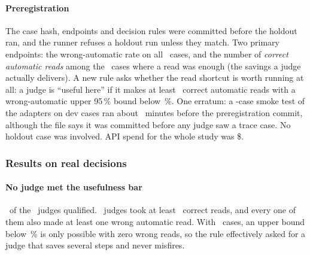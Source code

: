 \paragraph{Preregistration} The case hash, endpoints and decision rules were committed before the holdout
ran, and the runner refuses a holdout run unless they match. Two primary endpoints: the wrong-automatic rate
on all \TrN\ cases, and the number of \emph{correct automatic reads} among the \TrReadCases\ cases where a
read was enough (the savings a judge actually delivers). A new rule asks whether the read shortcut is worth
running at all: a judge is ``useful here'' if it makes at least \TrUsefulMinReads\ correct automatic reads
with a wrong-automatic upper 95\,\% bound below \TrUsefulMaxUpperPct\,\%. One erratum: a
\TrSmokeCases-case smoke test of the adapters on dev cases ran about \TrSmokeMinutes\ minutes before the
preregistration commit, although the file says it was committed before any judge saw a trace case. No
holdout case was involved. API spend for the whole study was \$\TrSpendTotal.

\subsubsection{Results on real decisions \texorpdfstring{\prereg}{[preregistered]}}\label{jb:sec:traceresults}

\begin{table}[tbp]
\centering\small
\caption{Real read-shortcut decisions, holdout \prereg: \TrN\ cases, \TrReps\ repetitions, the bundle's
read-shortcut gate. Per-case majorities over repetitions. ``Upper'' is the upper end of the 95\,\% Wilson
interval of the wrong-automatic rate. ``Correct reads'' counts correct automatic reads among the
\TrReadCases\ cases whose label is a read. Latency pools all valid requests. The last row is the reference
that never acts.}
\label{jb:tab:trace}
{\footnotesize\setlength{\tabcolsep}{2pt}}
\end{table}

\paragraph{No judge met the usefulness bar} \TrNUseful\ of the \NumBase\ judges qualified. \TrNGeMinReads\
judges took at least \TrUsefulMinReads\ correct reads, and every one of them also made at least one wrong
automatic read. With \TrN\ cases, an upper bound below \TrUsefulMaxUpperPct\,\% is only possible with zero
wrong reads, so the rule effectively asked for a judge that saves several steps and never misfires.

